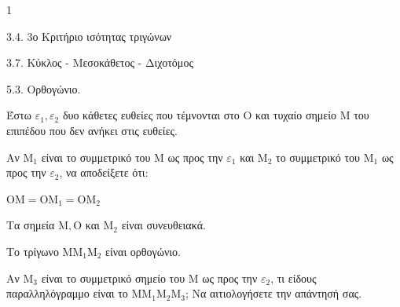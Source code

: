 \begin{ylh}{1}
    \item 3.4. 3ο Κριτήριο ισότητας τριγώνων
    \item 3.7. Κύκλος - Μεσοκάθετος - Διχοτόμος
    \item 5.3. Ορθογώνιο.
\end{ylh}
Έστω $\varepsilon_1, \varepsilon_2$ δυο κάθετες ευθείες που τέμνονται στο $\mathrm{O}$ και τυχαίο σημείο $\mathrm{M}$ του επιπέδου που δεν ανήκει στις ευθείες.
\begin{alist}
    \item Αν $\mathrm{M}_1$ είναι το συμμετρικό του $\mathrm{M}$ ως προς την $\varepsilon_1$ και $\mathrm{M}_2$ το συμμετρικό του $\mathrm{M}_1$ ως προς την $\varepsilon_2$, να αποδείξετε ότι:
    \begin{rlist}
        \item $\mathrm{O}\mathrm{M} = \mathrm{O}\mathrm{M}_1 = \mathrm{O}\mathrm{M}_2$ 
        \item Τα σημεία $\mathrm{M}, \mathrm{O}$ και $\mathrm{M}_2$ είναι συνευθειακά. 
        \item Το τρίγωνο $\mathrm{M}\mathrm{M}_1\mathrm{M}_2$ είναι ορθογώνιο. 
    \end{rlist}
    \item Αν $\mathrm{M}_3$ είναι το συμμετρικό σημείο του $\mathrm{M}$ ως προς την $\varepsilon_2$, τι είδους παραλληλόγραμμο είναι το $\mathrm{M}\mathrm{M}_1\mathrm{M}_2\mathrm{M}_3$; Να αιτιολογήσετε την απάντησή σας. 
\end{alist}
